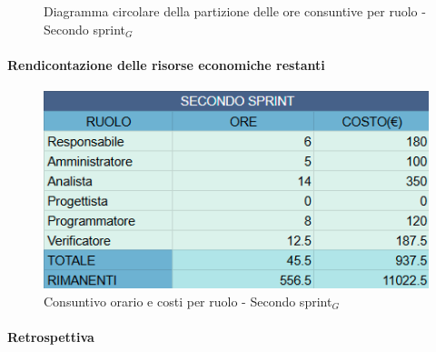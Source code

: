 \documentclass[10pt]{article}
\begin{document}
{{{    \begin{figure}[H]
        \centering
        \caption{Diagramma circolare della partizione delle ore consuntive per ruolo - Secondo sprint$_G$ }
        \label{fig:Diagramma circolare della partizione delle ore consuntive per ruolo - secondo sprint$_G$}
    \end{figure}

    \paragraph{Rendicontazione delle risorse economiche restanti}\mbox{}\vspace{0.4em}
    \begin{figure}[H]
    	\centering
    	\includegraphics[width=0.6\linewidth]{oreCostiSecondoSprint.png}
    	\caption{Consuntivo orario e costi per ruolo - Secondo sprint$_G$}
    	\label{fig:Consuntivo orario e costi per ruolo - Secondo sprint$_G$}
    \end{figure}
    
    \paragraph{Retrospettiva}\mbox{}\vspace{0.4em}
    
}}}
\end{document}
